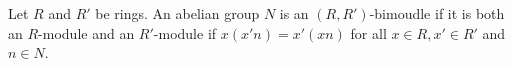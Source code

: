 \documentclass{article}
\begin{document}
\begin{definition}
    Let $R$ and $R'$ be rings. An abelian group $N$ is an $(R,R')$-bimoudle if it is both an $R$-module and an $R'$-module if $x(x'n) = x'(xn)$ for all $x\in R,x'\in R'$ and $n\in N$.
\end{definition}
\newpage




\end{document}
